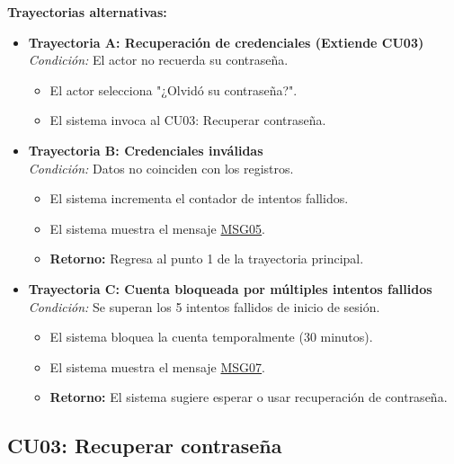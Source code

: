 \begin{appendices}
\textbf{Trayectorias alternativas:}
\begin{itemize}[leftmargin=*]
    \item \textbf{Trayectoria A: Recuperación de credenciales (Extiende CU03)} \\
    \textit{Condición:} El actor no recuerda su contraseña.
    \begin{itemize}[nosep]
        \item[A-1:] El actor selecciona "¿Olvidó su contraseña?".
        \item[A-2:] El sistema invoca al CU03: Recuperar contraseña.
    \end{itemize}
    \item \textbf{Trayectoria B: Credenciales inválidas} \\
    \textit{Condición:} Datos no coinciden con los registros.
    \begin{itemize}[nosep]
        \item[B-1:] El sistema incrementa el contador de intentos fallidos.
        \item[B-2:] El sistema muestra el mensaje \hyperlink{msg:MSG05}{MSG05}.
        \item \textbf{Retorno:} Regresa al punto 1 de la trayectoria principal.
    \end{itemize}
    \item \textbf{Trayectoria C: Cuenta bloqueada por múltiples intentos fallidos} \\
    \textit{Condición:} Se superan los 5 intentos fallidos de inicio de sesión.
    \begin{itemize}[nosep]
        \item[C-1:] El sistema bloquea la cuenta temporalmente (30 minutos).
        \item[C-2:] El sistema muestra el mensaje \hyperlink{msg:MSG07}{MSG07}.
        \item \textbf{Retorno:} El sistema sugiere esperar o usar recuperación de contraseña.
    \end{itemize}
\end{itemize}

\newpage

\subsection{CU03: Recuperar contraseña}


\end{appendices}

